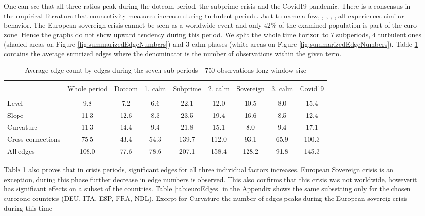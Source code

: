 \documentclass[12pt,bibliography=totoc]{article}
\begin{document}
One can see that all three ratios peak during the dotcom period, the subprime crisis and the Covid19 pandemic. There is a consensus in the empirical literature that connectivity measures increase during turbulent periods. Just to name a few, \cite{diebold2009measuring}, \cite{billio2012econometric}, \cite{sowmya2016linkages}, \cite{ahmad2018financial}, all experiences similar behavior. The European sovereign crisis cannot be seen as a worldwide event and only 42\% of the examined population is part of the euro-zone. Hence the graphs do not show upward tendency during this period. We split the whole time horizon to 7 subperiods, 4 turbulent ones (shaded areas on Figure \ref{fig:summarizedEdgeNumbers}) and 3 calm phases (white areas on Figure \ref{fig:summarizedEdgeNumbers}). Table \ref{tab:periods} contains the average sumrized edges where the denominator is the number of observations within the given term. 


\begin{table}[H]
\fontsize{10}{10}\selectfont
\centering%
\begin{tabular}{l  cccccccc}%
\hline\hline \\ [-1.5ex]                         %


				& Whole period  &Dotcom	&1. calm  & Subprime & 2. calm &Sovereign & 3. calm & Covid19 \\
\hline \\ [-1.5ex]  
Level			&9.8 &7.2		&6.6		&22.1			&12.0		&10.5		&8.0	&15.4\\
Slope			&11.3 &12.6		&8.3		&23.5			&19.4		&16.6		&8.5		&12.4\\
Curvature		&11.3 &14.4		&9.4	&21.8		&15.1			&8.0		&9.4		&17.1\\
Cross connections	&75.5 &43.4		&54.3	&139.7	&112.0		&93.1		&65.9		&100.3\\
All edges		&108.0 &77.6		&78.6		&207.1		&158.4	&128.2	&91.8		&145.3\\


\hline            
\end{tabular}
\caption{Average edge count by edges during the seven sub-periods - 750 observations long window size} %
\label{tab:periods}
\end{table}


Table \ref{tab:periods} also proves that in crisis periods, significant edges for all three individual factors increases. European Sovereign crisis is an exception, during this phase further decrease in edge numbers is observed. This also confirms that this crisis was not worldwide, howeverit has significant effects on a subset of the countries. Table \ref{tab:euroEdges} in the Appendix shows the same subsetting only for the chosen eurozone countries (DEU, ITA, ESP, FRA, NDL). Except for Curvature the number of edges peaks during the European sovereig crisis during this time.
\end{document}
